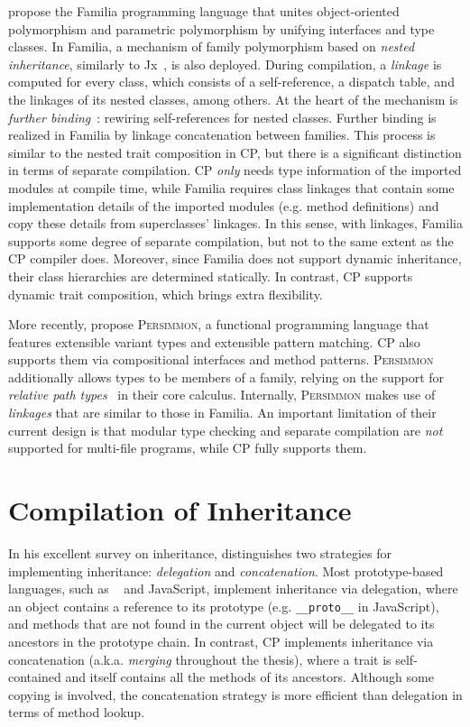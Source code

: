 \citet{zhang2017familia} propose the Familia programming language that unites
object-oriented polymorphism and parametric polymorphism by unifying interfaces
and type classes. In Familia, a mechanism of family polymorphism based on
\emph{nested inheritance}, similarly to Jx~\citep{nystrom2004scalable}, is also
deployed. During compilation, a \emph{linkage} is computed for every class,
which consists of a self-reference, a dispatch table, and the linkages of its
nested classes, among others. At the heart of the mechanism is \emph{further
binding}~\citep{madsen1993object}: rewiring self-references for nested classes.
Further binding is realized in Familia by linkage concatenation between
families. This process is similar to the nested trait composition in CP, but
there is a significant distinction in terms of separate compilation. CP
\emph{only} needs type information of the imported modules at compile time,
while Familia requires class linkages that contain some implementation details
of the imported modules (e.g. method definitions) and copy these details from
superclasses' linkages. In this sense, with linkages, Familia supports some
degree of separate compilation, but not to the same extent as the CP compiler
does. Moreover, since Familia does not support dynamic inheritance, their class
hierarchies are determined statically. In contrast, CP supports dynamic trait
composition, which brings extra flexibility.

More recently, \citet{kravchuk2024persimmon} propose \textsc{Persimmon}, a
functional programming language that features extensible variant types and
extensible pattern matching. CP also supports them via compositional interfaces
and method patterns. \textsc{Persimmon} additionally allows types to be members
of a family, relying on the support for \emph{relative path
types}~\citep{saito2008lightweight} in their core calculus. Internally,
\textsc{Persimmon} makes use of \emph{linkages} that are similar to those in
Familia. An important limitation of their current design is that modular type
checking and separate compilation are \emph{not} supported for multi-file
programs, while CP fully supports them.

\section{Compilation of Inheritance}

In his excellent survey on inheritance, \citet{taivalsaari1996notion}
distinguishes two strategies for implementing inheritance: \emph{delegation} and
\emph{concatenation}. Most prototype-based languages, such as
\self~\citep{ungar1987self} and JavaScript, implement inheritance via
delegation, where an object contains a reference to its prototype (e.g.
\lstinline{__proto__} in JavaScript), and methods that are not found in the
current object will be delegated to its ancestors in the prototype chain. In
contrast, CP implements inheritance via concatenation (a.k.a. \emph{merging}
throughout the thesis), where a trait is self-contained and itself contains all
the methods of its ancestors. Although some copying is involved, the
concatenation strategy is more efficient than delegation in terms of method
lookup.

